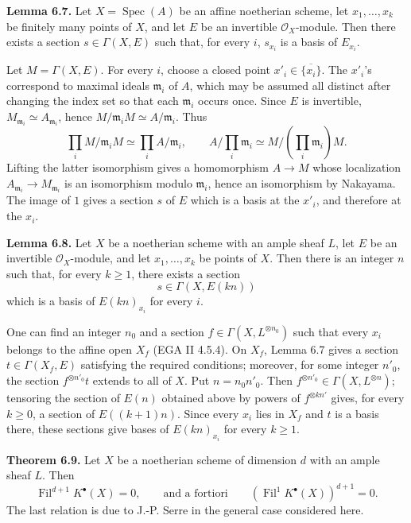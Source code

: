 \documentclass[11pt]{article}
\newcommand{\Fil}{\operatorname{Fil}}
\newcommand{\Spec}{\operatorname{Spec}}
\begin{document}
\textbf{Lemma 6.7.} Let \(X=\Spec(A)\) be an affine noetherian scheme, let \(x_1,\ldots,x_k\) be finitely many points of \(X\), and let \(E\) be an invertible \(\mathcal O_X\)-module. Then there exists a section \(s\in\Gamma(X,E)\) such that, for every \(i\), \(s_{x_i}\) is a basis of \(E_{x_i}\).

Let \(M=\Gamma(X,E)\). For every \(i\), choose a closed point \(x'_i\in\overline{\{x_i\}}\). The \(x'_i\)'s correspond to maximal ideals \(\mathfrak m_i\) of \(A\), which may be assumed all distinct after changing the index set so that each \(\mathfrak m_i\) occurs once. Since \(E\) is invertible, \(M_{\mathfrak m_i}\simeq A_{\mathfrak m_i}\), hence \(M/\mathfrak m_iM\simeq A/\mathfrak m_i\). Thus
\[
  \prod_i M/\mathfrak m_iM\simeq\prod_i A/\mathfrak m_i,
  \qquad
  A/\prod_i\mathfrak m_i\simeq M/\left(\prod_i\mathfrak m_i\right)M.
\]
Lifting the latter isomorphism gives a homomorphism \(A\to M\) whose localization \(A_{\mathfrak m_i}\to M_{\mathfrak m_i}\) is an isomorphism modulo \(\mathfrak m_i\), hence an isomorphism by Nakayama. The image of \(1\) gives a section \(s\) of \(E\) which is a basis at the \(x'_i\), and therefore at the \(x_i\).

\textbf{Lemma 6.8.} Let \(X\) be a noetherian scheme with an ample sheaf \(L\), let \(E\) be an invertible \(\mathcal O_X\)-module, and let \(x_1,\ldots,x_k\) be points of \(X\). Then there is an integer \(n\) such that, for every \(k\geq1\), there exists a section
\[
  s\in \Gamma(X,E(kn))
\]
which is a basis of \(E(kn)_{x_i}\) for every \(i\).

One can find an integer \(n_0\) and a section \(f\in\Gamma(X,L^{\otimes n_0})\) such that every \(x_i\) belongs to the affine open \(X_f\) (EGA II 4.5.4). On \(X_f\), Lemma 6.7 gives a section \(t\in\Gamma(X_f,E)\) satisfying the required conditions; moreover, for some integer \(n'_0\), the section \(f^{\otimes n'_0}t\) extends to all of \(X\). Put \(n=n_0n'_0\). Then \(f^{\otimes n'_0}\in\Gamma(X,L^{\otimes n})\); tensoring the section of \(E(n)\) obtained above by powers of \(f^{\otimes kn'}\) gives, for every \(k\geq0\), a section of \(E((k+1)n)\). Since every \(x_i\) lies in \(X_f\) and \(t\) is a basis there, these sections give bases of \(E(kn)_{x_i}\) for every \(k\geq1\).

\textbf{Theorem 6.9.} Let \(X\) be a noetherian scheme of dimension \(d\) with an ample sheaf \(L\). Then
\[
  \Fil^{d+1}K^\bullet(X)=0,
  \qquad\text{and a fortiori}\qquad
  (\Fil^1K^\bullet(X))^{d+1}=0.
\]
The last relation is due to J.-P. Serre in the general case considered here.
\end{document}
